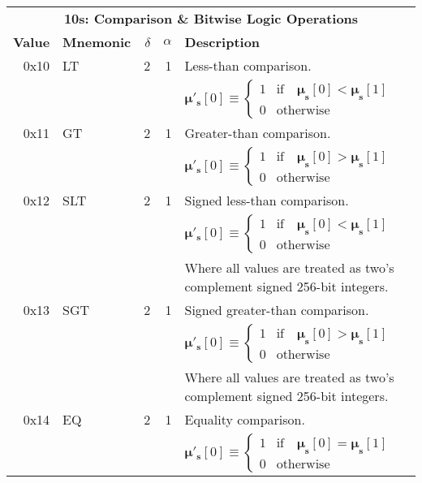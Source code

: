 \documentclass[9pt,oneside]{amsart}
\begin{document}
\begin{tabular*}{\columnwidth}[h]{rlrrl}
\toprule
\multicolumn{5}{c}{\textbf{10s: Comparison \& Bitwise Logic Operations}} \\
\textbf{Value} & \textbf{Mnemonic} & $\delta$ & $\alpha$ & \textbf{Description} \vspace{5pt} \\
0x10 & {\small LT} & 2 & 1 & Less-than comparison. \\
&&&& $\boldsymbol{\mu}'_{\mathbf{s}}[0] \equiv \begin{cases} 1 & \text{if} \quad \boldsymbol{\mu}_{\mathbf{s}}[0] < \boldsymbol{\mu}_{\mathbf{s}}[1] \\ 0 & \text{otherwise} \end{cases}$ \\
\midrule
0x11 & {\small GT} & 2 & 1 & Greater-than comparison. \\
&&&& $\boldsymbol{\mu}'_{\mathbf{s}}[0] \equiv \begin{cases} 1 & \text{if} \quad \boldsymbol{\mu}_{\mathbf{s}}[0] > \boldsymbol{\mu}_{\mathbf{s}}[1] \\ 0 & \text{otherwise} \end{cases}$ \\
\midrule
0x12 & {\small SLT} & 2 & 1 & Signed less-than comparison. \\
&&&& $\boldsymbol{\mu}'_{\mathbf{s}}[0] \equiv \begin{cases} 1 & \text{if} \quad \boldsymbol{\mu}_{\mathbf{s}}[0] < \boldsymbol{\mu}_{\mathbf{s}}[1] \\ 0 & \text{otherwise} \end{cases}$ \\
&&&& Where all values are treated as two's complement signed 256-bit integers. \\
\midrule
0x13 & {\small SGT} & 2 & 1 & Signed greater-than comparison. \\
&&&& $\boldsymbol{\mu}'_{\mathbf{s}}[0] \equiv \begin{cases} 1 & \text{if} \quad \boldsymbol{\mu}_{\mathbf{s}}[0] > \boldsymbol{\mu}_{\mathbf{s}}[1] \\ 0 & \text{otherwise} \end{cases}$ \\
&&&& Where all values are treated as two's complement signed 256-bit integers. \\
\midrule
0x14 & {\small EQ} & 2 & 1 & Equality comparison. \\
&&&& $\boldsymbol{\mu}'_{\mathbf{s}}[0] \equiv \begin{cases} 1 & \text{if} \quad \boldsymbol{\mu}_{\mathbf{s}}[0] = \boldsymbol{\mu}_{\mathbf{s}}[1] \\ 0 & \text{otherwise} \end{cases}$ \\

\end{tabular*}
\end{document}
